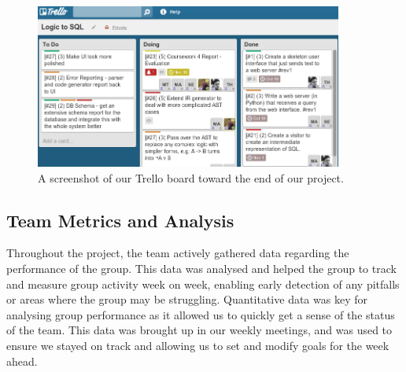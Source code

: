 \documentclass[a4paper, 11pt]{article}
\begin{document}

    \begin{figure}[h!]
      \centering
      \includegraphics[width=0.9\textwidth]{images/trello.png}
      \caption{A screenshot of our Trello board toward the end of our project.}
    \end{figure}

 \subsection{Team Metrics and Analysis}
Throughout the project, the team actively gathered data regarding the performance of the group. This data was analysed and helped the group to track and measure group activity week on week, enabling early detection of any pitfalls or areas where the group may be struggling. Quantitative data was key for analysing group performance as it allowed us to quickly get a sense of the status of the team. This data was brought up in our weekly meetings, and was used to ensure we stayed on track and allowing us to set and modify goals for the week ahead.
\end{document}
